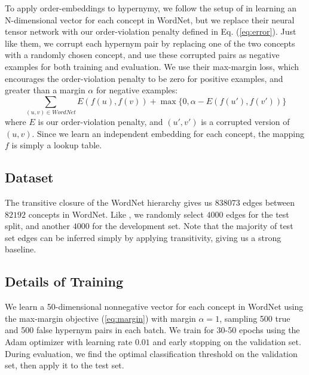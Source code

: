 \documentclass{article} \usepackage{iclr2016_conference,times}
\begin{document}
To apply  order-embeddings  to hypernymy, we follow the setup of \citet{socher2013reasoning} in learning an N-dimensional vector for each concept in WordNet, but  we replace their neural tensor network with our order-violation penalty defined in Eq. (\ref{eq:error}).
Just like them, we corrupt each hypernym pair by replacing one of the two concepts with a randomly chosen concept, and use these corrupted pairs as negative examples for both training and evaluation. We use their max-margin loss, which encourages the order-violation penalty to be zero for positive examples, and greater than a margin $\alpha$ for negative examples:
\begin{equation} \sum_{(u,v) \in WordNet} E(f(u), f(v))  + \max\{0, \alpha - E(f(u'), f(v')) \}  \label{eq:margin} \end{equation}
where $E$ is our order-violation penalty, and $(u', v')$ is a corrupted version of $(u, v)$. Since we learn an independent embedding for each concept, the mapping $f$ is simply a lookup table.

\vspace{-0.5mm}
\subsection{Dataset}
\vspace{-0.5mm}

The transitive closure of the WordNet hierarchy gives us $838073$ edges between $82192$ concepts in WordNet. Like \citet{bordes2011learning}, we randomly select $4000$ edges for the test split, and another $4000$ for the development set. Note that the majority of test set edges can be inferred simply by applying transitivity, giving us a strong baseline. 

\vspace{-0.5mm}
\subsection{Details of Training}
\vspace{-0.5mm}

We learn a 50-dimensional nonnegative vector for each concept in WordNet using the max-margin objective (\ref{eq:margin}) with margin $\alpha = 1$, sampling 500 true and 500 false hypernym pairs in each batch. We train for 30-50 epochs using the Adam optimizer \citep{adam} with learning rate $0.01$ and early stopping on the validation set. 
During evaluation, we find the optimal classification threshold on the validation set, then apply it to the test set.
\end{document}
